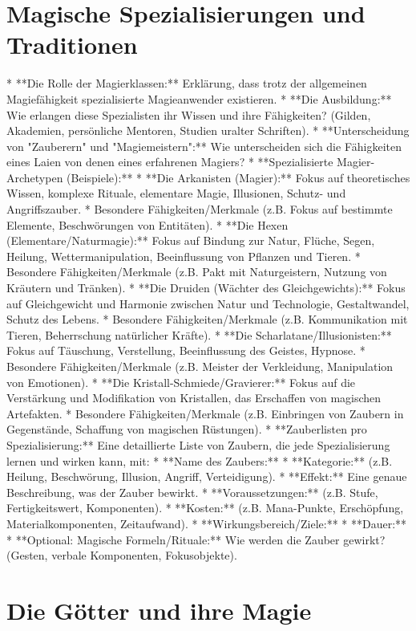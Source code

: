 \documentclass[10pt,a4paper,twocolumn,openany]{book}
\begin{document}
\chapter{Magische Spezialisierungen und Traditionen}

* **Die Rolle der Magierklassen:** Erklärung, dass trotz der allgemeinen Magiefähigkeit spezialisierte Magieanwender existieren.
* **Die Ausbildung:** Wie erlangen diese Spezialisten ihr Wissen und ihre Fähigkeiten? (Gilden, Akademien, persönliche Mentoren, Studien uralter Schriften).
* **Unterscheidung von "Zauberern" und "Magiemeistern":** Wie unterscheiden sich die Fähigkeiten eines Laien von denen eines erfahrenen Magiers?
* **Spezialisierte Magier-Archetypen (Beispiele):**
* **Die Arkanisten (Magier):** Fokus auf theoretisches Wissen, komplexe Rituale, elementare Magie, Illusionen, Schutz- und Angriffszauber.
* Besondere Fähigkeiten/Merkmale (z.B. Fokus auf bestimmte Elemente, Beschwörungen von Entitäten).
* **Die Hexen (Elementare/Naturmagie):** Fokus auf Bindung zur Natur, Flüche, Segen, Heilung, Wettermanipulation, Beeinflussung von Pflanzen und Tieren.
* Besondere Fähigkeiten/Merkmale (z.B. Pakt mit Naturgeistern, Nutzung von Kräutern und Tränken).
* **Die Druiden (Wächter des Gleichgewichts):** Fokus auf Gleichgewicht und Harmonie zwischen Natur und Technologie, Gestaltwandel, Schutz des Lebens.
* Besondere Fähigkeiten/Merkmale (z.B. Kommunikation mit Tieren, Beherrschung natürlicher Kräfte).
* **Die Scharlatane/Illusionisten:** Fokus auf Täuschung, Verstellung, Beeinflussung des Geistes, Hypnose.
* Besondere Fähigkeiten/Merkmale (z.B. Meister der Verkleidung, Manipulation von Emotionen).
* **Die Kristall-Schmiede/Gravierer:** Fokus auf die Verstärkung und Modifikation von Kristallen, das Erschaffen von magischen Artefakten.
* Besondere Fähigkeiten/Merkmale (z.B. Einbringen von Zaubern in Gegenstände, Schaffung von magischen Rüstungen).
* **Zauberlisten pro Spezialisierung:** Eine detaillierte Liste von Zaubern, die jede Spezialisierung lernen und wirken kann, mit:
* **Name des Zaubers:**
* **Kategorie:** (z.B. Heilung, Beschwörung, Illusion, Angriff, Verteidigung).
* **Effekt:** Eine genaue Beschreibung, was der Zauber bewirkt.
* **Voraussetzungen:** (z.B. Stufe, Fertigkeitswert, Komponenten).
* **Kosten:** (z.B. Mana-Punkte, Erschöpfung, Materialkomponenten, Zeitaufwand).
* **Wirkungsbereich/Ziele:**
* **Dauer:**
* **Optional: Magische Formeln/Rituale:** Wie werden die Zauber gewirkt? (Gesten, verbale Komponenten, Fokusobjekte).

\chapter{Die Götter und ihre Magie}
\end{document}
